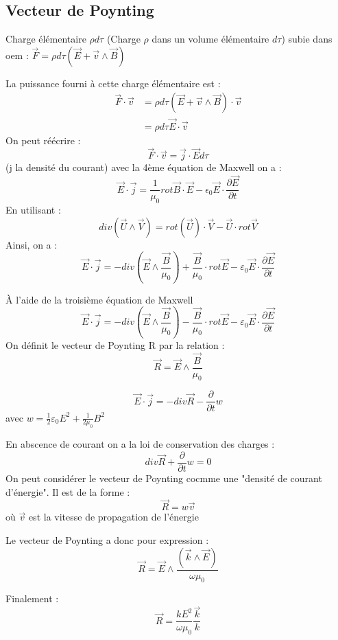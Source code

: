 \documentclass[12pt,a4paper]{report}
\begin{document}
\subsection{Vecteur de Poynting}

Charge élémentaire \(\rho d \tau\) (Charge \(\rho\) dans un volume élémentaire \(d\tau\)) subie dans oem : \(\vec{F} = \rho d \tau (\vec{E} + \vec{v} \wedge \vec{B})\)

La puissance fourni à cette charge élémentaire est :
\begin{align*}
	\vec{F} \cdot \vec{v} &= \rho d \tau (\vec{E} + \vec{v} \wedge \vec{B}) \cdot \vec{v}\\
	&=  \rho d \tau \vec{E} \cdot \vec{v}
\end{align*}
On peut réécrire :
\[
	\vec{F} \cdot \vec{v} = \vec{j} \cdot \vec{E}d\tau
\]
(j la densité du courant)
avec la 4ème équation de Maxwell on a :
\[
	\vec{E}\cdot \vec{j} = \dfrac{1}{\mu_0} rot \vec{B} \cdot \vec{E} - \epsilon_0 \vec{E} \cdot \dfrac{\partial \vec{E}}{\partial t}
\]
En utilisant :
\[
	div(\vec{U} \wedge \vec{V}) = rot (\vec{U}) \cdot \vec{V} - \vec{U} \cdot rot \vec{V}
\]
Ainsi, on a :
\[
	\vec{E} \cdot \vec{j} = -div \left( \vec{E} \wedge \dfrac{\vec{B}}{\mu_0} \right) + \dfrac{\vec{B}}{\mu_0} \cdot rot \vec{E} - \varepsilon_0 \vec{E} \cdot \dfrac{\partial \vec{E}}{\partial t}
\]

À l'aide de la troisième équation de Maxwell 
\[
	\vec{E} \cdot \vec{j} = -div \left( \vec{E} \wedge \dfrac{\vec{B}}{\mu_0} \right) - \dfrac{\vec{B}}{\mu_0} \cdot rot \vec{E} - \varepsilon_0 \vec{E} \cdot \dfrac{\partial \vec{E}}{\partial t} 
\]
On définit le vecteur de Poynting R par la relation :
\[
	\vec{R} = \vec{E} \wedge \dfrac{\vec{B}}{\mu_0}
\]

\[
	\vec{E} \cdot \vec{j} = -div \vec{R} - \dfrac{\partial}{\partial t} w
\]
avec \(w = \frac{1}{2} \varepsilon_0 E^2 + \frac{1}{2\mu_0} B^2\)

En abscence de courant on a la loi de conservation des charges :
\[
	div \vec{R} + \dfrac{\partial}{\partial t} w = 0
\]
On peut considérer le vecteur de Poynting cocmme une "densité de courant d'énergie". Il est de la forme :
\[
	\vec{R} = w \vec{v}
\]
où \(\vec{v}\) est la vitesse de propagation de l'énergie

Le vecteur de Poynting a donc pour expression :
\[
	\vec{R} = \vec{E} \wedge \dfrac{(\vec{k} \wedge \vec{E})}{\omega \mu_0}
\]

Finalement :
\[
	\vec{R} = \dfrac{k E^2}{\omega \mu_0} \dfrac{\vec{k}}{k}
\]
\end{document}
